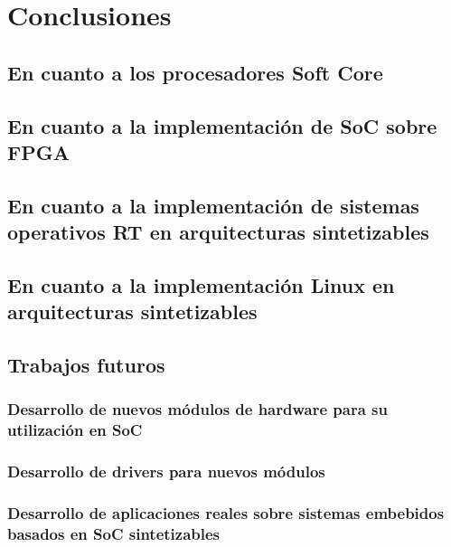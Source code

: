  \chapter{Conclusiones}
	\section{En cuanto a los procesadores Soft Core} 
	
	
	\section{En cuanto a la implementación de SoC sobre FPGA} 
		
		
	\section{En cuanto a la implementación de sistemas operativos RT en arquitecturas sintetizables} 
		
	
	\section{En cuanto a la implementación Linux en arquitecturas sintetizables} 
		

	\section{Trabajos futuros}
		\subsection{Desarrollo de nuevos módulos de hardware para su utilización en SoC}
		
		\subsection{Desarrollo de drivers para nuevos módulos}
		
		\subsection{Desarrollo de aplicaciones reales sobre sistemas embebidos basados en SoC sintetizables}
		
		
	
	 